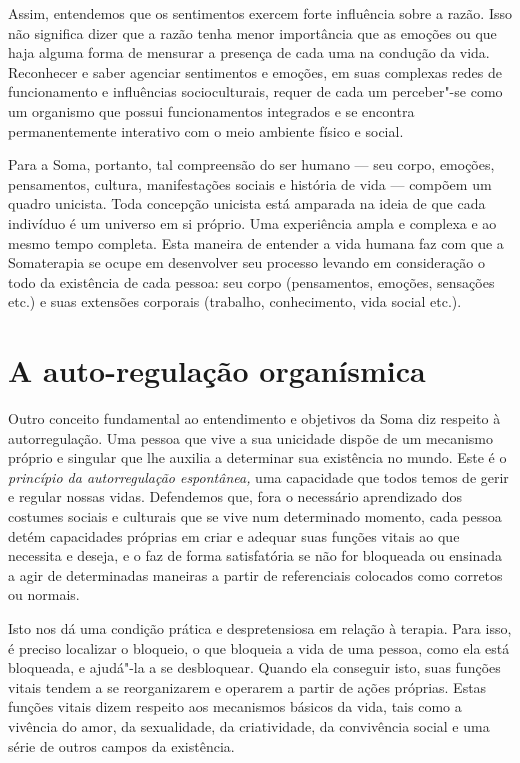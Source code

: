 Assim, entendemos que os sentimentos exercem forte influência sobre a
razão. Isso não significa dizer que a razão tenha menor importância que
as emoções ou que haja alguma forma de mensurar a presença de cada uma
na condução da vida. Reconhecer e saber agenciar sentimentos e emoções,
em suas complexas redes de funcionamento e influências socioculturais,
requer de cada um perceber"-se como um organismo que possui
funcionamentos integrados e se encontra permanentemente interativo com o
meio ambiente físico e social.

Para a Soma, portanto, tal compreensão do ser humano --- seu corpo,
emoções, pensamentos, cultura, manifestações sociais e história de vida
--- compõem um quadro unicista. Toda concepção unicista está amparada na
ideia de que cada indivíduo é um universo em si próprio. Uma experiência
ampla e complexa e ao mesmo tempo completa. Esta maneira de entender a
vida humana faz com que a Somaterapia se ocupe em desenvolver seu
processo levando em consideração o todo da existência de cada pessoa:
seu corpo (pensamentos, emoções, sensações etc.) e suas extensões
corporais (trabalho, conhecimento, vida social etc.).

\section{A auto-regulação organísmica}

Outro conceito fundamental ao entendimento e objetivos da Soma diz
respeito à autorregulação. Uma pessoa que vive a sua unicidade dispõe de
um mecanismo próprio e singular que lhe auxilia a determinar sua
existência no mundo. Este é o \emph{princípio da autorregulação
espontânea,} uma capacidade que todos temos de gerir e regular nossas
vidas. Defendemos que, fora o necessário aprendizado dos costumes
sociais e culturais que se vive num determinado momento, cada pessoa
detém capacidades próprias em criar e adequar suas funções vitais ao que
necessita e deseja, e o faz de forma satisfatória se não for
bloqueada ou ensinada a agir de determinadas maneiras a partir de
referenciais colocados como corretos ou normais.

Isto nos dá uma condição prática e despretensiosa em relação à terapia.
Para isso, é preciso localizar o bloqueio, o que bloqueia a vida de uma
pessoa, como ela está bloqueada, e ajudá"-la a se desbloquear. Quando ela
conseguir isto, suas funções vitais tendem a se reorganizarem e operarem
a partir de ações próprias. Estas funções vitais dizem respeito aos
mecanismos básicos da vida, tais como a vivência do amor, da
sexualidade, da criatividade, da convivência social e uma série de
outros campos da existência.

